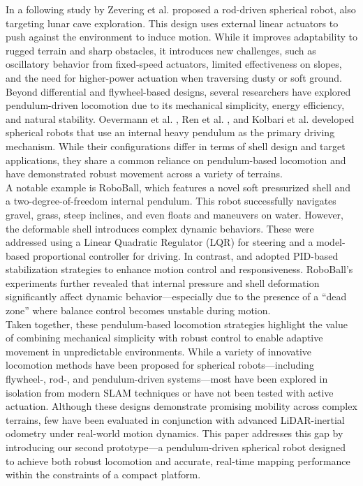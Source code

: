 \documentclass[conference]{IEEEtran}
\begin{document}
In a following study by Zevering et al.\cite{rod_sphere} proposed a rod-driven spherical robot, also targeting lunar cave exploration. This design uses external linear actuators to push against the environment to induce motion. While it improves adaptability to rugged terrain and sharp obstacles, it introduces new challenges, such as oscillatory behavior from fixed-speed actuators, limited effectiveness on slopes, and the need for higher-power actuation when traversing dusty or soft ground.\\

Beyond differential and flywheel-based designs, several researchers have explored pendulum-driven locomotion due to its mechanical simplicity, energy efficiency, and natural stability. Oevermann et al. \cite{roboball}, Ren et al. \cite{novelsphere}, and  Kolbari et al. \cite{pendulum_sphere} developed spherical robots that use an internal heavy pendulum as the primary driving mechanism. While their configurations differ in terms of shell design and target applications, they share a common reliance on pendulum-based locomotion and have demonstrated robust movement across a variety of terrains.\\

A notable example is RoboBall\cite{roboball}, which features a novel soft pressurized shell and a two-degree-of-freedom internal pendulum. This robot successfully navigates gravel, grass, steep inclines, and even floats and maneuvers on water. However, the deformable shell introduces complex dynamic behaviors. These were addressed using a Linear Quadratic Regulator (LQR) for steering and a model-based proportional controller for driving. In contrast, \cite{novelsphere} and \cite{pendulum_sphere} adopted PID-based stabilization strategies to enhance motion control and responsiveness. RoboBall’s experiments further revealed that internal pressure and shell deformation significantly affect dynamic behavior—especially due to the presence of a “dead zone” where balance control becomes unstable during motion.\\

Taken together, these pendulum-based locomotion strategies highlight the value of combining mechanical simplicity with robust control to enable adaptive movement in unpredictable environments. While a variety of innovative locomotion methods have been proposed for spherical robots—including flywheel-, rod-, and pendulum-driven systems—most have been explored in isolation from modern SLAM techniques or have not been tested with active actuation. Although these designs demonstrate promising mobility across complex terrains, few have been evaluated in conjunction with advanced LiDAR-inertial odometry under real-world motion dynamics. This paper addresses this gap by introducing our second prototype—a pendulum-driven spherical robot designed to achieve both robust locomotion and accurate, real-time mapping performance within the constraints of a compact platform.
\end{document}
